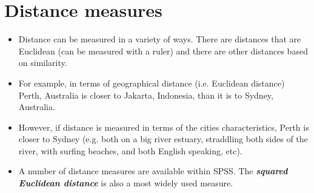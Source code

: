 \documentclass[a4paper,12pt]{report}
\begin{document}
%
%
%





\section{Distance measures}
\begin{itemize}
\item Distance can be measured in a variety of ways. There are distances that are Euclidean (can be measured with a ruler) and there are other distances based on similarity.
\item  For example, in terms of
geographical distance (i.e. Euclidean distance) Perth, Australia is closer to Jakarta, Indonesia, than it is to Sydney, Australia.
\item 
However, if distance is measured in terms of the cities characteristics, Perth is closer to Sydney (e.g. both on a big river estuary, straddling both sides of the river, with surfing beaches, and both English speaking, etc). 
\item A number of distance measures are available within SPSS. The \textbf{\textit{squared Euclidean distance}} is also a most widely used measure.
\end{itemize}
\end{document}
